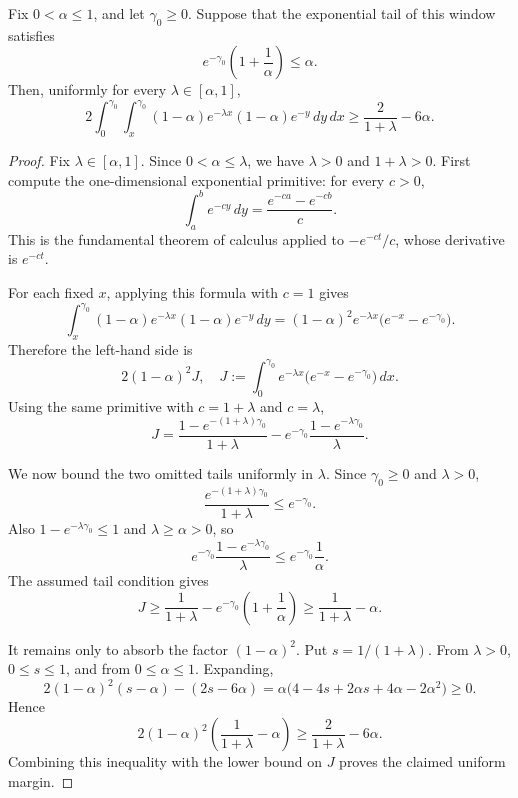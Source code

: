 \begin{helper}
Fix \(0<\alpha\le1\), and let \(\gamma_0\ge0\).  Suppose that the
exponential tail of this window satisfies
\[
e^{-\gamma_0}\left(1+\frac1\alpha\right)\le \alpha .
\]
Then, uniformly for every \(\lambda\in[\alpha,1]\),
\[
2\int_0^{\gamma_0}\int_x^{\gamma_0}
(1-\alpha)e^{-\lambda x}(1-\alpha)e^{-y}\,dy\,dx
\ge
\frac{2}{1+\lambda}-6\alpha .
\]
\end{helper}
\begin{proof}
Fix \(\lambda\in[\alpha,1]\).  Since \(0<\alpha\le\lambda\), we have
\(\lambda>0\) and \(1+\lambda>0\).  First compute the one-dimensional
exponential primitive: for every \(c>0\),
\[
\int_a^b e^{-cy}\,dy=\frac{e^{-ca}-e^{-cb}}{c}.
\]
This is the fundamental theorem of calculus applied to
\(-e^{-ct}/c\), whose derivative is \(e^{-ct}\).

For each fixed \(x\), applying this formula with \(c=1\) gives
\[
\int_x^{\gamma_0}
(1-\alpha)e^{-\lambda x}(1-\alpha)e^{-y}\,dy
=
(1-\alpha)^2e^{-\lambda x}\bigl(e^{-x}-e^{-\gamma_0}\bigr).
\]
Therefore the left-hand side is
\[
2(1-\alpha)^2 J,
\quad
J:=\int_0^{\gamma_0}
e^{-\lambda x}\bigl(e^{-x}-e^{-\gamma_0}\bigr)\,dx .
\]
Using the same primitive with \(c=1+\lambda\) and \(c=\lambda\),
\[
J=
\frac{1-e^{-(1+\lambda)\gamma_0}}{1+\lambda}
-e^{-\gamma_0}\frac{1-e^{-\lambda\gamma_0}}{\lambda}.
\]

We now bound the two omitted tails uniformly in \(\lambda\).  Since
\(\gamma_0\ge0\) and \(\lambda>0\),
\[
\frac{e^{-(1+\lambda)\gamma_0}}{1+\lambda}\le e^{-\gamma_0}.
\]
Also \(1-e^{-\lambda\gamma_0}\le1\) and \(\lambda\ge\alpha>0\), so
\[
e^{-\gamma_0}\frac{1-e^{-\lambda\gamma_0}}{\lambda}
\le e^{-\gamma_0}\frac1\alpha .
\]
The assumed tail condition gives
\[
J\ge
\frac1{1+\lambda}
-e^{-\gamma_0}\left(1+\frac1\alpha\right)
\ge
\frac1{1+\lambda}-\alpha .
\]

It remains only to absorb the factor \((1-\alpha)^2\).  Put
\(s=1/(1+\lambda)\).  From \(\lambda>0\), \(0\le s\le1\), and from
\(0\le\alpha\le1\).  Expanding,
\[
2(1-\alpha)^2(s-\alpha)-(2s-6\alpha)
=\alpha\bigl(4-4s+2\alpha s+4\alpha-2\alpha^2\bigr)\ge0.
\]
Hence
\[
2(1-\alpha)^2\left(\frac1{1+\lambda}-\alpha\right)
\ge
\frac2{1+\lambda}-6\alpha .
\]
Combining this inequality with the lower bound on \(J\) proves the claimed
uniform margin.
\end{proof}
